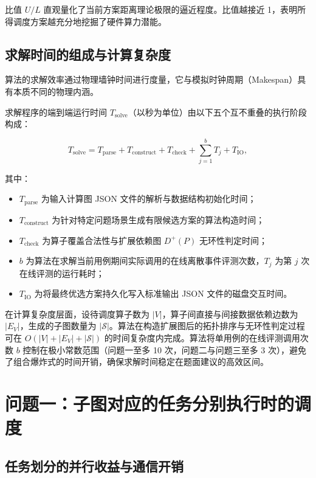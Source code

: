 \documentclass[anonymous,notoc]{gmcm2026}
\providecommand{\tightlist}{\setlength{\itemsep}{0pt}\setlength{\parskip}{0pt}}
\begin{document}
比值 \(U/L\) 直观量化了当前方案距离理论极限的逼近程度。比值越接近 1，表明所得调度方案越充分地挖掘了硬件算力潜能。

\subsection{求解时间的组成与计算复杂度}

算法的求解效率通过物理墙钟时间进行度量，它与模拟时钟周期（Makespan）具有本质不同的物理内涵。

求解程序的端到端运行时间 \(T_{\mathrm{solve}}\)（以秒为单位）由以下五个互不重叠的执行阶段构成：

\[T_{\mathrm{solve}} = T_{\mathrm{parse}} + T_{\mathrm{construct}} + T_{\mathrm{check}} + \sum_{j=1}^{b} T_j + T_{\mathrm{IO}},\]

其中：

\begin{itemize}
\tightlist
\item
  \(T_{\mathrm{parse}}\) 为输入计算图 JSON 文件的解析与数据结构初始化时间；
\item
  \(T_{\mathrm{construct}}\) 为针对特定问题场景生成有限候选方案的算法构造时间；
\item
  \(T_{\mathrm{check}}\) 为算子覆盖合法性与扩展依赖图 \(D^+(P)\) 无环性判定时间；
\item
  \(b\) 为算法在求解当前用例期间实际调用的在线离散事件评测次数，\(T_j\) 为第 \(j\) 次在线评测的运行耗时；
\item
  \(T_{\mathrm{IO}}\) 为将最终优选方案持久化写入标准输出 JSON 文件的磁盘交互时间。
\end{itemize}

在计算复杂度层面，设待调度算子数为 \(|V|\)，算子间直接与间接数据依赖边数为 \(|E_V|\)，生成的子图数量为 \(|\mathcal{S}|\)。算法在构造扩展图后的拓扑排序与无环性判定过程可在 \(O(|V| + |E_V| + |\mathcal{S}|)\) 的时间复杂度内完成。算法将单用例的在线评测调用次数 \(b\) 控制在极小常数范围（问题一至多 10 次，问题二与问题三至多 3 次），避免了组合爆炸式的时间开销，确保求解时间稳定在题面建议的高效区间。


\section{问题一：子图对应的任务分别执行时的调度}

\subsection{任务划分的并行收益与通信开销}
\end{document}
